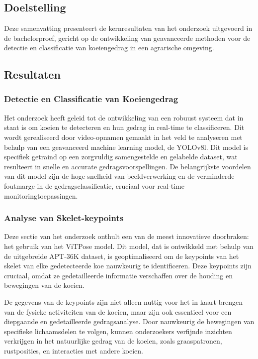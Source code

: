 \chapter{}%
\label{ch:resultaten}

\section{Doelstelling}
Deze samenvatting presenteert de kernresultaten van het onderzoek uitgevoerd in de bachelorproef, gericht op de ontwikkeling van geavanceerde methoden voor de detectie en classificatie van koeiengedrag in een agrarische omgeving.

\section{Resultaten}
\subsection{Detectie en Classificatie van Koeiengedrag}
Het onderzoek heeft geleid tot de ontwikkeling van een robuust systeem dat in staat is om koeien te detecteren en hun gedrag in real-time te classificeren. Dit wordt gerealiseerd door video-opnamen gemaakt in het veld te analyseren met behulp van een geavanceerd machine learning model, de YOLOv8l. Dit model is specifiek getraind op een zorgvuldig samengestelde en gelabelde dataset, wat resulteert in snelle en accurate gedragsvoorspellingen. De belangrijkste voordelen van dit model zijn de hoge snelheid van beeldverwerking en de verminderde foutmarge in de gedragsclassificatie, cruciaal voor real-time monitoringtoepassingen.
\subsection{Analyse van Skelet-keypoints}
Deze sectie van het onderzoek onthult een van de meest innovatieve doorbraken: het gebruik van het ViTPose model. Dit model, dat is ontwikkeld met behulp van de uitgebreide APT-36K dataset, is geoptimaliseerd om de keypoints van het skelet van elke gedetecteerde koe nauwkeurig te identificeren. Deze keypoints zijn cruciaal, omdat ze gedetailleerde informatie verschaffen over de houding en bewegingen van de koeien.

De gegevens van de keypoints zijn niet alleen nuttig voor het in kaart brengen van de fysieke activiteiten van de koeien, maar zijn ook essentieel voor een diepgaande en gedetailleerde gedragsanalyse. Door nauwkeurig de bewegingen van specifieke lichaamsdelen te volgen, kunnen onderzoekers verfijnde inzichten verkrijgen in het natuurlijke gedrag van de koeien, zoals graaspatronen, rustposities, en interacties met andere koeien.

